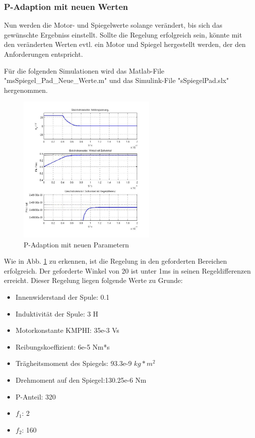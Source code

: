 \subsubsection{P-Adaption mit neuen Werten}
\label{chap:p_adaptionwerte}
Nun werden die Motor- und Spiegelwerte solange verändert, bis sich das gewünschte Ergebniss einstellt. 
Sollte die Regelung erfolgreich sein, könnte mit den veränderten Werten evtl. ein Motor und Spiegel hergestellt werden, der den Anforderungen entspricht.

Für die folgenden Simulationen wird das Matlab-File "msSpiegel_Pad_Neue_Werte.m" und das Simulink-File "sSpiegelPad.slx" hergenommen.
\begin{figure}[!h]
	\centering
	\includegraphics[width=0.6\textwidth]{Pad-Neue-Werte-P320F1_2F2_65.jpg}
	\caption{P-Adaption mit neuen Parametern}
	\label{fig:padneuewerte}
\end{figure}
Wie in Abb. \ref{fig:padneuewerte} zu erkennen, ist die Regelung in den geforderten Bereichen erfolgreich.
Der geforderte Winkel von 20{\textdegree} ist unter 1ms in seinen Regeldifferenzen erreicht. 
Dieser Regelung liegen folgende Werte zu Grunde:
\begin{itemize}
\item Innenwiderstand der Spule: 0.1 \Omega
\item Induktivität der Spule: 3 \mu H
\item Motorkonstante KMPHI: 35e-3 Vs
\item Reibungskoeffizient: 6e-5 Nm*s
\item Trägheitsmoment des Spiegels: 93.3e-9 $kg*m^2$
\item Drehmoment auf den Spiegel:130.25e-6 Nm
\item P-Anteil: 320
\item $f_1$: 2
\item $f_2$: 160
\end{itemize}

